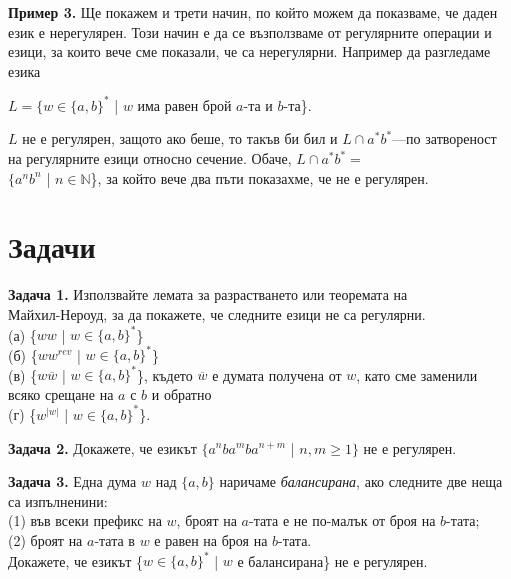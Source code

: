 \documentclass{article}
\begin{document}
    \vspace{15pt}

    \textbf{Пример 3.} Ще покажем и трети начин, по който можем да показваме, че даден
    език е нерегулярен. Този начин е да се възползваме от регулярните операции и езици,
    за които вече сме показали, че са нерегулярни. Например да разгледаме езика
    \begin{center}
        $L = \{w \in \{a,b\}^*$ | $w$ има равен брой $a$-та и $b$-та\}.
    \end{center}
    $L$ не е регулярен, защото ако беше, то такъв би бил и $L \cap a^*b^*$—по затвореност
    на регулярните езици относно сечение. Обаче, $L \cap a^*b^* =$ \\
    $\{a^nb^n$ | $n \in \mathbb{N}$\},
    за който вече два пъти показахме, че не е регулярен.
\vspace{25pt}

\section{Задачи}
    \textbf{Задача 1.} Използвайте лемата за разрастването или теоремата на \\Майхил-Нероуд,
    за да покажете, че следните езици не са регулярни. \\
    (а) \{$ww$ | $w \in \{a,b\}^*$\} \\
    (б) \{$ww^{rev}$ | $w \in \{a,b\}^*$\} \\
    (в) \{$w\overline{w}$ | $w \in \{a,b\}^*$\}, където $\overline{w}$ е думата получена от $w$, 
    като сме заменили всяко срещане на $a$ с $b$ и обратно \\
    (г) \{$w^{|w|}$ | $w \in \{a,b\}^*$\}.

    \vspace{15pt}

    \textbf{Задача 2.} Докажете, че езикът $\{a^nba^mba^{n+m}$ | $n,m \geq 1\}$ не е 
    регулярен.

    \vspace{15pt}

    \textbf{Задача 3.} Една дума $w$ над $\{a,b\}$ наричаме \textit{балансирана}, ако следните
    две неща са изпълненини: \\
    (1) във всеки префикс на $w$, броят на $a$-тата е не по-малък от броя на $b$-тата; \\
    (2) броят на $a$-тата в $w$ е равен на броя на $b$-тата. \\
    Докажете, че езикът \{$w \in \{a,b\}^*$ | $w$ е балансирана\} не е регулярен.
\end{document}
